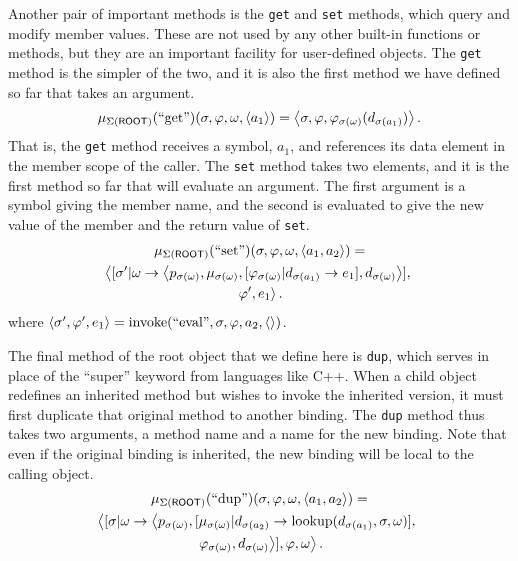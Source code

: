 \documentclass[twocolumn]{article}
\begin{document}
Another pair of important methods is the \texttt{get} and \texttt{set}
methods, which query and modify member values. These are not used by
any other built-in functions or methods, but they are an important
facility for user-defined objects. The \texttt{get} method is the
simpler of the two, and it is also the first method we have defined so
far that takes an argument.
\[ \mu_{\Sigma(\mathsf{ROOT})}(\text{``get''})(\sigma,\varphi,\omega,
\left< a_1\right>) = \left< \sigma, \varphi,
\varphi_{\sigma(\omega)}(d_{\sigma(a_1)})\right>.\] That is, the
\texttt{get} method receives a symbol, $a_1$, and references its data
element in the member scope of the caller. The \texttt{set} method
takes two elements, and it is the first method so far that will
evaluate an argument. The first argument is a symbol giving the member
name, and the second is evaluated to give the new value of the member
and the return value of \texttt{set}.
\begin{multline*}
  \mu_{\Sigma(\mathsf{ROOT})}(\text{``set''})(\sigma,\varphi,\omega,
  \left< a_1,a_2\right>) =\\ \left< [\sigma'|\omega\rightarrow \left< p_{\sigma(\omega)},
  \mu_{\sigma(\omega)},[\varphi_{\sigma(\omega)}|d_{\sigma(a_1)}\rightarrow e_1],
  d_{\sigma(\omega)}\right>],\right.\\\left.\varphi', e_1\right>.
\end{multline*}
where $\left< \sigma',\varphi',e_1 \right> = \operatorname{invoke}(\text{``eval''},\sigma,
\varphi, a_2, \left<\right>)$.

The final method of the root object that we define here is
\texttt{dup}, which serves in place of the ``super'' keyword from
languages like C++. When a child object redefines an inherited method
but wishes to invoke the inherited version, it must first duplicate
that original method to another binding. The \texttt{dup} method thus
takes two arguments, a method name and a name for the new
binding. Note that even if the original binding is inherited, the new
binding will be local to the calling object.
\begin{multline*}
  \mu_{\Sigma(\mathsf{ROOT})}(\text{``dup''})(\sigma,\varphi,\omega,
  \left< a_1,a_2\right>) =\\ \left< [\sigma|\omega\rightarrow \left<
  p_{\sigma(\omega)}, [\mu_{\sigma(\omega)}|d_{\sigma(a_2)}\rightarrow
  \operatorname{lookup}(d_{\sigma(a_1)},\sigma,\omega)],\right.\right.\\\left.\left.
  \varphi_{\sigma(\omega)},
  d_{\sigma(\omega)}\right>],\varphi, \omega\right>.
\end{multline*}
\end{document}
